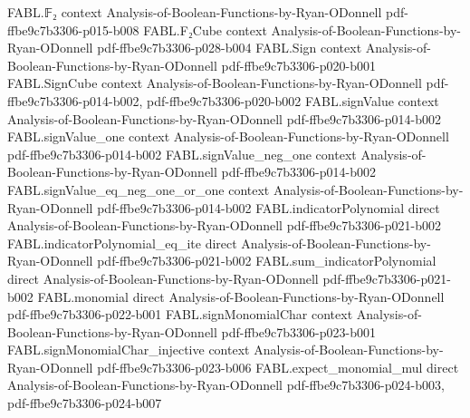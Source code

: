 \begin{theorem}
\label{FABL.naeTest_close_to_signedDictator}
\leanok
{}
\proofstep
  {FABL.𝔽₂}
  {context}
  {Analysis-of-Boolean-Functions-by-Ryan-ODonnell}
  {pdf-ffbe9c7b3306-p015-b008}
\proofstep
  {FABL.F₂Cube}
  {context}
  {Analysis-of-Boolean-Functions-by-Ryan-ODonnell}
  {pdf-ffbe9c7b3306-p028-b004}
\proofstep
  {FABL.Sign}
  {context}
  {Analysis-of-Boolean-Functions-by-Ryan-ODonnell}
  {pdf-ffbe9c7b3306-p020-b001}
\proofstep
  {FABL.SignCube}
  {context}
  {Analysis-of-Boolean-Functions-by-Ryan-ODonnell}
  {pdf-ffbe9c7b3306-p014-b002,
    pdf-ffbe9c7b3306-p020-b002}
\proofstep
  {FABL.signValue}
  {context}
  {Analysis-of-Boolean-Functions-by-Ryan-ODonnell}
  {pdf-ffbe9c7b3306-p014-b002}
\proofstep
  {FABL.signValue_one}
  {context}
  {Analysis-of-Boolean-Functions-by-Ryan-ODonnell}
  {pdf-ffbe9c7b3306-p014-b002}
\proofstep
  {FABL.signValue_neg_one}
  {context}
  {Analysis-of-Boolean-Functions-by-Ryan-ODonnell}
  {pdf-ffbe9c7b3306-p014-b002}
\proofstep
  {FABL.signValue_eq_neg_one_or_one}
  {context}
  {Analysis-of-Boolean-Functions-by-Ryan-ODonnell}
  {pdf-ffbe9c7b3306-p014-b002}
\proofstep
  {FABL.indicatorPolynomial}
  {direct}
  {Analysis-of-Boolean-Functions-by-Ryan-ODonnell}
  {pdf-ffbe9c7b3306-p021-b002}
\proofstep
  {FABL.indicatorPolynomial_eq_ite}
  {direct}
  {Analysis-of-Boolean-Functions-by-Ryan-ODonnell}
  {pdf-ffbe9c7b3306-p021-b002}
\proofstep
  {FABL.sum_indicatorPolynomial}
  {direct}
  {Analysis-of-Boolean-Functions-by-Ryan-ODonnell}
  {pdf-ffbe9c7b3306-p021-b002}
\proofstep
  {FABL.monomial}
  {direct}
  {Analysis-of-Boolean-Functions-by-Ryan-ODonnell}
  {pdf-ffbe9c7b3306-p022-b001}
\proofstep
  {FABL.signMonomialChar}
  {context}
  {Analysis-of-Boolean-Functions-by-Ryan-ODonnell}
  {pdf-ffbe9c7b3306-p023-b001}
\proofstep
  {FABL.signMonomialChar_injective}
  {context}
  {Analysis-of-Boolean-Functions-by-Ryan-ODonnell}
  {pdf-ffbe9c7b3306-p023-b006}
\proofstep
  {FABL.expect_monomial_mul}
  {direct}
  {Analysis-of-Boolean-Functions-by-Ryan-ODonnell}
  {pdf-ffbe9c7b3306-p024-b003,
    pdf-ffbe9c7b3306-p024-b007}

\end{theorem}
